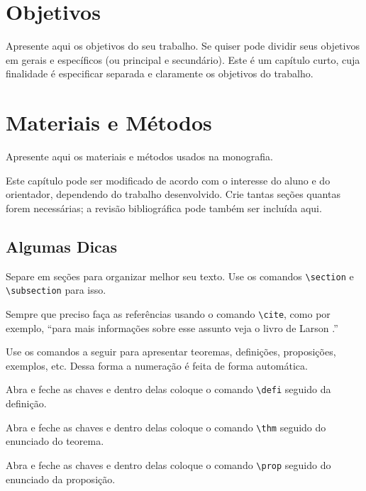 \documentclass[12pt,a4paper,header]{abnt}
\begin{document}
\chapter{Objetivos}
Apresente aqui os objetivos do seu trabalho. Se quiser pode dividir seus objetivos em gerais e específicos (ou principal e secundário). Este é um capítulo curto, cuja finalidade é especificar separada e claramente os objetivos do trabalho.


\chapter{Materiais e Métodos}

Apresente aqui os materiais e métodos usados na monografia. 

Este capítulo pode ser modificado de acordo com o interesse do aluno e do orientador, dependendo do trabalho desenvolvido. Crie tantas seções quantas forem necessárias; a revisão bibliográfica pode também ser incluída aqui.


\section{Algumas Dicas}

Separe em seções para organizar melhor seu texto. Use os comandos \verb|\section| e \verb|\subsection| para isso. 

Sempre que preciso faça as referências usando o comando \verb|\cite|, como por exemplo, ``para mais informações sobre esse assunto veja o livro de Larson \cite{larson}.''

Use os comandos a seguir para apresentar teoremas, definições, proposições, exemplos, etc. Dessa forma a numeração é feita de forma automática. 

{
Abra e feche as chaves e dentro delas coloque o comando \verb|\defi| seguido da definição. 
}

{\thm
Abra e feche as chaves e dentro delas coloque o comando \verb|\thm| seguido do enunciado do teorema. 
}

{\prop
Abra e feche as chaves e dentro delas coloque o comando \verb|\prop| seguido do enunciado da proposição.
}
\end{document}
